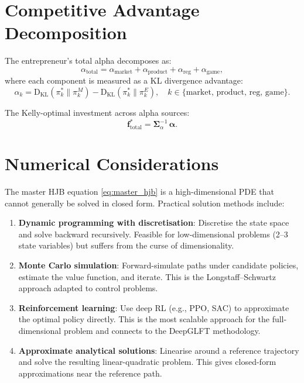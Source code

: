 \documentclass[12pt,a4paper,oneside]{book}
\theoremstyle{definition}
\theoremstyle{remark}
\newcommand{\KL}{\mathrm{D}_{\mathrm{KL}}}
\begin{document}
\section{Competitive Advantage Decomposition}

The entrepreneur's total alpha decomposes as:
\begin{equation}\label{eq:total_alpha}
  \alpha_{\text{total}} = \alpha_{\text{market}}
    + \alpha_{\text{product}}
    + \alpha_{\text{reg}}
    + \alpha_{\text{game}},
\end{equation}
where each component is measured as a KL divergence advantage:
\begin{equation}\label{eq:alpha_components}
  \alpha_k = \KL(\pi^*_k \| \pi^M_k) - \KL(\pi^*_k \| \pi^E_k),
  \quad k \in \{\text{market, product, reg, game}\}.
\end{equation}

The Kelly-optimal investment across alpha sources:
\begin{equation}\label{eq:kelly_portfolio}
  \mathbf{f}^*_{\text{total}} = \boldsymbol{\Sigma}_\alpha^{-1}\,
    \boldsymbol{\alpha}.
\end{equation}

\section{Numerical Considerations}

The master HJB equation \eqref{eq:master_hjb} is a high-dimensional PDE that
cannot generally be solved in closed form. Practical solution methods include:

\begin{enumerate}[nosep]
  \item \textbf{Dynamic programming with discretisation}: Discretise the state
    space and solve backward recursively. Feasible for low-dimensional problems
    (2--3 state variables) but suffers from the curse of dimensionality.
  \item \textbf{Monte Carlo simulation}: Forward-simulate paths under candidate
    policies, estimate the value function, and iterate. This is the Longstaff--Schwartz
    approach adapted to control problems.
  \item \textbf{Reinforcement learning}: Use deep RL (e.g., PPO, SAC) to
    approximate the optimal policy directly. This is the most scalable approach
    for the full-dimensional problem and connects to the DeepGLFT methodology.
  \item \textbf{Approximate analytical solutions}: Linearise around a reference
    trajectory and solve the resulting linear-quadratic problem. This gives
    closed-form approximations near the reference path.
\end{enumerate}
\end{document}

